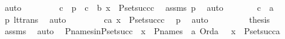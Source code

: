 \begin{isabellebody}
\ auto\ \isanewline
\ \ \ \ \isamarkupfalse%
\ \isamarkupfalse%
\ c\ \ p{}\ {\isacharcolon}{\kern0pt}\ {\isachardoublequoteopen}c\ {\isacharless}{\kern0pt}\ b{\isachardoublequoteclose}\ {\isachardoublequoteopen}x\ {\isasymin}\ P{\isacharunderscore}{\kern0pt}set{\isacharparenleft}{\kern0pt}succ{\isacharparenleft}{\kern0pt}c{\isacharparenright}{\kern0pt}{\isacharparenright}{\kern0pt}{\isachardoublequoteclose}\ \isamarkupfalse%
\ assms\ p{}\ \isamarkupfalse%
\ auto\isanewline
\ \ \ \ \isamarkupfalse%
\ \isamarkupfalse%
\ {\isachardoublequoteopen}c\ {\isacharless}{\kern0pt}\ a{\isachardoublequoteclose}\ \isamarkupfalse%
\ p{}\ lt{\isacharunderscore}{\kern0pt}trans\ \isamarkupfalse%
\ auto\ \isanewline
\ \ \ \ \isamarkupfalse%
\ \isamarkupfalse%
\ {\isachardoublequoteopen}{\isacharparenleft}{\kern0pt}{\isasymexists}c{\isacharless}{\kern0pt}a{\isachardot}{\kern0pt}\ x\ {\isasymin}\ P{\isacharunderscore}{\kern0pt}set{\isacharparenleft}{\kern0pt}succ{\isacharparenleft}{\kern0pt}c{\isacharparenright}{\kern0pt}{\isacharparenright}{\kern0pt}{\isacharparenright}{\kern0pt}{\isachardoublequoteclose}\ \isamarkupfalse%
\ p{}\ \isamarkupfalse%
\ auto\ \isanewline
\ \ \isamarkupfalse%
\isanewline
\ \ \isamarkupfalse%
\ \isamarkupfalse%
\ {\isacharquery}{\kern0pt}thesis\ \isamarkupfalse%
\ assms\ \isamarkupfalse%
\ auto\ \isanewline
{}\isamarkupfalse%
%
\endisatagproof
{\isafoldproof}%
%
\isadelimproof
\isanewline
%
\endisadelimproof
\isanewline
{}\isamarkupfalse%
\ P{\isacharunderscore}{\kern0pt}names{\isacharunderscore}{\kern0pt}in{\isacharunderscore}{\kern0pt}P{\isacharunderscore}{\kern0pt}set{\isacharunderscore}{\kern0pt}succ\ {\isacharcolon}{\kern0pt}\ {\isachardoublequoteopen}x\ {\isasymin}\ P{\isacharunderscore}{\kern0pt}names\ {\isasymLongrightarrow}\ {\isasymexists}a{\isachardot}{\kern0pt}\ Ord{\isacharparenleft}{\kern0pt}a{\isacharparenright}{\kern0pt}\ {\isasymand}\ \ x\ {\isasymin}\ P{\isacharunderscore}{\kern0pt}set{\isacharparenleft}{\kern0pt}succ{\isacharparenleft}{\kern0pt}a{\isacharparenright}{\kern0pt}{\isacharparenright}{\kern0pt}{\isachardoublequoteclose}\ \isanewline
%
\isadelimproof
%
\endisadelimproof
%
\isatagproof
{}\isamarkupfalse%
\ {\isacharminus}{\kern0pt}\ \isanewline

\end{isabellebody}
